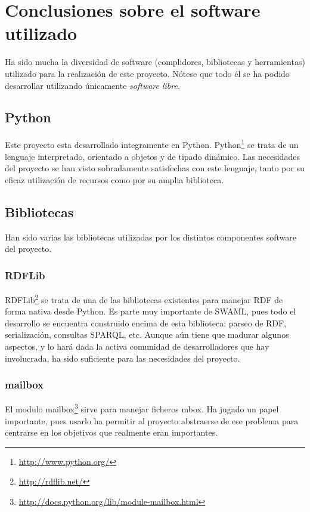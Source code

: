 
\section{Conclusiones sobre el software utilizado}

Ha sido mucha la diversidad de software (complidores, bibliotecas y herramientas)
utilizado para la realización de este proyecto. Nótese que todo él se ha podido
desarrollar utilizando únicamente \emph{software libre}.

\subsection{Python}

Este proyecto esta desarrollado integramente en Python. Python\footnote{\url{http://www.python.org/}}
se trata de un lenguaje interpretado, orientado a objetos y de tipado dinámico.
Las necesidades del proyecto se han visto sobradamente satisfechas con este lenguaje,
tanto por su eficaz utilización de recursos como por su amplia biblioteca. 

\subsection{Bibliotecas\label{sec:conclu:bib}}

Han sido varias las bibliotecas utilizadas por los distintos componentes software
del proyecto.

\subsubsection{RDFLib}

RDFLib\footnote{\url{http://rdflib.net/}} se trata de una de las bibliotecas
existentes para manejar RDF de forma nativa desde Python. Es parte muy 
importante de SWAML, pues todo el desarrollo se encuentra construido encima 
de esta biblioteca: parseo de RDF, serialización, consultas SPARQL, etc. Aunque 
aún tiene que madurar algunos aspectos, y lo hará dada la activa comunidad de
desarrolladores que hay involucrada, ha sido suficiente para las necesidades
del proyecto.

\subsubsection{mailbox}

El modulo mailbox\footnote{\url{http://docs.python.org/lib/module-mailbox.html}}
sirve para manejar ficheros mbox. Ha jugado un papel importante, pues usarlo
ha permitir al proyecto abstraerse de ese problema para centrarse en los
objetivos que realmente eran importantes.

